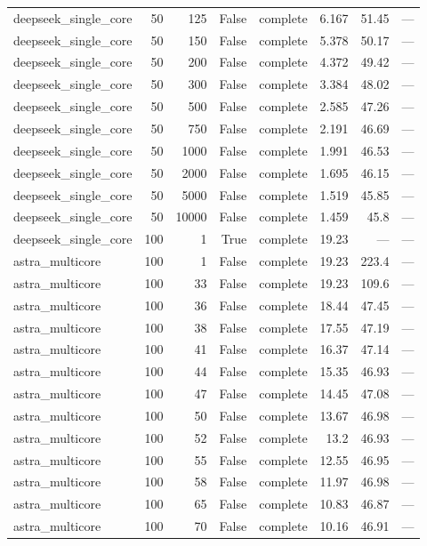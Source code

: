 \begin{tabular}{lrrrlrrl}
deepseek\_single\_core & 50 & 125 & False & complete & 6.167 & 51.45 & — \\
deepseek\_single\_core & 50 & 150 & False & complete & 5.378 & 50.17 & — \\
deepseek\_single\_core & 50 & 200 & False & complete & 4.372 & 49.42 & — \\
deepseek\_single\_core & 50 & 300 & False & complete & 3.384 & 48.02 & — \\
deepseek\_single\_core & 50 & 500 & False & complete & 2.585 & 47.26 & — \\
deepseek\_single\_core & 50 & 750 & False & complete & 2.191 & 46.69 & — \\
deepseek\_single\_core & 50 & 1000 & False & complete & 1.991 & 46.53 & — \\
deepseek\_single\_core & 50 & 2000 & False & complete & 1.695 & 46.15 & — \\
deepseek\_single\_core & 50 & 5000 & False & complete & 1.519 & 45.85 & — \\
deepseek\_single\_core & 50 & 10000 & False & complete & 1.459 & 45.8 & — \\
deepseek\_single\_core & 100 & 1 & True & complete & 19.23 & — & — \\
astra\_multicore & 100 & 1 & False & complete & 19.23 & 223.4 & — \\
astra\_multicore & 100 & 33 & False & complete & 19.23 & 109.6 & — \\
astra\_multicore & 100 & 36 & False & complete & 18.44 & 47.45 & — \\
astra\_multicore & 100 & 38 & False & complete & 17.55 & 47.19 & — \\
astra\_multicore & 100 & 41 & False & complete & 16.37 & 47.14 & — \\
astra\_multicore & 100 & 44 & False & complete & 15.35 & 46.93 & — \\
astra\_multicore & 100 & 47 & False & complete & 14.45 & 47.08 & — \\
astra\_multicore & 100 & 50 & False & complete & 13.67 & 46.98 & — \\
astra\_multicore & 100 & 52 & False & complete & 13.2 & 46.93 & — \\
astra\_multicore & 100 & 55 & False & complete & 12.55 & 46.95 & — \\
astra\_multicore & 100 & 58 & False & complete & 11.97 & 46.98 & — \\
astra\_multicore & 100 & 65 & False & complete & 10.83 & 46.87 & — \\
astra\_multicore & 100 & 70 & False & complete & 10.16 & 46.91 & — \\

\end{tabular}
